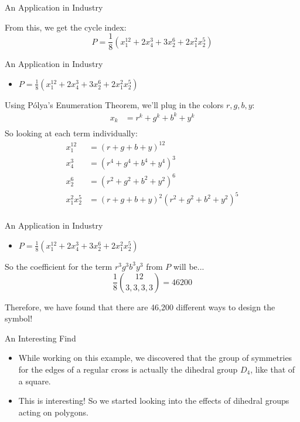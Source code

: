 \documentclass{beamer}
\begin{document}
\begin{frame}{An Application in Industry}

  From this, we get the cycle index:\\
  \[P = \frac{1}{8}(x_1^{12}+2x_4^3 +3x_2^6 +2x_1^2 x_2^5)\]

\end{frame}

\begin{frame}{An Application in Industry}
  \begin{itemize}
    \item $P = \frac{1}{8}(x_1^{12}+2x_4^3 +3x_2^6 +2x_1^2 x_2^5)$
  \end{itemize}
  Using Pólya's Enumeration Theorem, we'll plug in the colors $r,g,b,y$:\\
  \begin{align*}
    x_k &= r^k + g^k + b^k + y^k\\
  \end{align*}
  So looking at each term individually:
  \begin{align*}
    x_1^{12} &= (r+g+b+y)^{12}\\
    x_4^3 &=(r^4+g^4+b^4+y^4)^3\\
    x_2^6 &=(r^2+g^2+b^2+y^2)^6\\
    x_1^{2}x_2^5 &= (r+g+b+y)^2(r^2+g^2+b^2+y^2)^5\\
  \end{align*}
\end{frame}

\begin{frame}{An Application in Industry}

  \begin{itemize}
    \item $P = \frac{1}{8}(x_1^{12}+2x_4^3 +3x_2^6 +2x_1^2 x_2^5)$
  \end{itemize}
  So the coefficient for the term $r^3g^3b^3y^3$ from $P$ will be...\\

  \[\frac{1}{8}{{12}\choose{3,3,3,3}}=46200\]

  \vspace{40pt}
  Therefore, we have found that there are 46,200 different ways to design the symbol!

\end{frame}

\begin{frame}{An Interesting Find}
  \begin{itemize}
    \item While working on this example, we discovered that the group of symmetries for the edges of a regular cross is actually the dihedral group $D_4$, like that of a square.
    \item This is interesting! So we started looking into the effects of dihedral groups acting on polygons.
  \end{itemize}
\end{frame}
\end{document}
